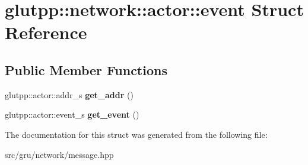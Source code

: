 \hypertarget{structglutpp_1_1network_1_1actor_1_1event}{\section{glutpp\-:\-:network\-:\-:actor\-:\-:event \-Struct \-Reference}
\label{structglutpp_1_1network_1_1actor_1_1event}
}
\subsection*{\-Public \-Member \-Functions}
\begin{DoxyCompactItemize}
\item 
\hypertarget{structglutpp_1_1network_1_1actor_1_1event_a2125cf1b21d1504452730c16fdb02dad}{glutpp\-::actor\-::addr\-\_\-s {\bfseries get\-\_\-addr} ()}\label{structglutpp_1_1network_1_1actor_1_1event_a2125cf1b21d1504452730c16fdb02dad}

\item 
\hypertarget{structglutpp_1_1network_1_1actor_1_1event_af4fcfbff282890ae1e8396be3081bc5b}{glutpp\-::actor\-::event\-\_\-s {\bfseries get\-\_\-event} ()}\label{structglutpp_1_1network_1_1actor_1_1event_af4fcfbff282890ae1e8396be3081bc5b}

\end{DoxyCompactItemize}


\-The documentation for this struct was generated from the following file\-:\begin{DoxyCompactItemize}
\item 
src/gru/network/message.\-hpp\end{DoxyCompactItemize}
